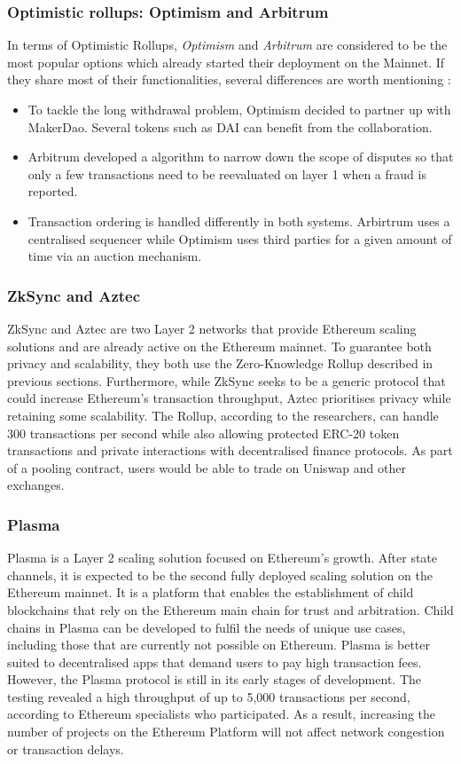 \subsubsection{Optimistic rollups:  Optimism and Arbitrum}

In terms of Optimistic Rollups, \textit{Optimism} and \textit{Arbitrum} are considered to be the most popular options which already started their deployment on the Mainnet. If they share most of their functionalities, several differences are worth mentioning :
\begin{itemize}
    \item To tackle the long withdrawal problem, Optimism decided to partner up with MakerDao. Several tokens such as DAI can benefit from the collaboration. 
    \item Arbitrum developed a algorithm to narrow down the scope of disputes so that only a few transactions need to be reevaluated on layer 1 when a fraud is reported.
    \item Transaction ordering is handled differently in both systems. Arbirtrum uses a centralised sequencer while Optimism uses third parties for a given amount of time via an auction mechanism.
\end{itemize}


\subsubsection{ZkSync and Aztec}
ZkSync and Aztec are two Layer 2 networks that provide Ethereum scaling solutions and are already active on the Ethereum mainnet. To guarantee both privacy and scalability, they both use the Zero-Knowledge Rollup described in previous sections. Furthermore, while ZkSync seeks to be a generic protocol that could increase Ethereum's transaction throughput, Aztec prioritises privacy while retaining some scalability. The Rollup, according to the researchers, can handle 300 transactions per second while also allowing protected ERC-20 token transactions and private interactions with decentralised finance protocols. As part of a pooling contract, users would be able to trade on Uniswap and other exchanges.
\subsubsection{Plasma}
Plasma is a Layer 2 scaling solution focused on Ethereum's growth. After state channels, it is expected to be the second fully deployed scaling solution on the Ethereum mainnet. It is a platform that enables the establishment of child blockchains that rely on the Ethereum main chain for trust and arbitration. Child chains in Plasma can be developed to fulfil the needs of unique use cases, including those that are currently not possible on Ethereum. Plasma is better suited to decentralised apps that demand users to pay high transaction fees. However, the Plasma protocol is still in its early stages of development. The testing revealed a high throughput of up to 5,000 transactions per second, according to Ethereum specialists who participated. As a result, increasing the number of projects on the Ethereum Platform will not affect network congestion or transaction delays.
